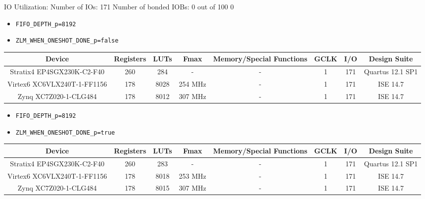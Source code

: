 \documentclass{article}
\begin{document}
IO Utilization: 
 Number of IOs:                         171
 Number of bonded IOBs:                   0  out of    100     0%
\fi

\iffalse
Timing Summary:
---------------
Speed Grade: -3

   Minimum period: 3.253ns (Maximum Frequency: 307.390MHz)
   Minimum input arrival time before clock: 2.359ns
   Maximum output required time after clock: 2.274ns
   Maximum combinational path delay: 1.609ns
\fi

\begin{itemize}
  \item \verb+FIFO_DEPTH_p=8192+
  \item \verb+ZLM_WHEN_ONESHOT_DONE_p=false+
\end{itemize}
\begin{scriptsize}
  \begin{tabular}{|c|c|c|c|c|c|c|c|}
    \hline
    \rowcolor{blue}
    Device                      & Registers & LUTs & Fmax        & Memory/Special Functions & GCLK & I/O & Design Suite    \\
    \hline
    Stratix4 EP4SGX230K-C2-F40  & 260       & 284  & -           & -                        & 1    & 171 &     Quartus 12.1 SP1\\
    \hline
    Virtex6 XC6VLX240T-1-FF1156 & 178       & 8028 & 254 MHz     & -                        & 1    & 171 & ISE 14.7        \\
    \hline
    Zynq XC7Z020-1-CLG484       & 178       & 8012 & 307 MHz     & -                        & 1    & 171 & ISE 14.7        \\
    \hline
  \end{tabular}
\end{scriptsize}
\begin{itemize}
  \item \verb+FIFO_DEPTH_p=8192+
  \item \verb+ZLM_WHEN_ONESHOT_DONE_p=true+
\end{itemize}
\begin{scriptsize}
  \begin{tabular}{|c|c|c|c|c|c|c|c|}
    \hline
    \rowcolor{blue}
    Device                      & Registers & LUTs & Fmax        & Memory/Special Functions & GCLK & I/O & Design Suite    \\
    \hline
    Stratix4 EP4SGX230K-C2-F40  & 260       & 283  & -           & -                        & 1    & 171 &     Quartus 12.1 SP1\\
    \hline
    Virtex6 XC6VLX240T-1-FF1156 & 178       & 8018 & 253 MHz     & -                        & 1    & 171 & ISE 14.7        \\
    \hline
    Zynq XC7Z020-1-CLG484       & 178       & 8015 & 307 MHz     & -                        & 1    & 171 & ISE 14.7        \\
    \hline
  \end{tabular}
\end{scriptsize}
\end{document}
